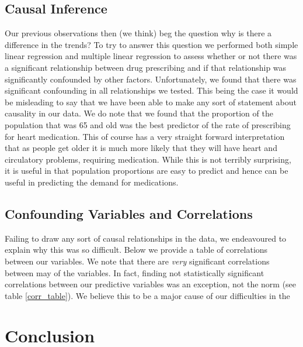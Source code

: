 \documentclass[a4paper]{article}
\begin{document}
	\subsection{Causal Inference}
		Our previous observations then (we think) beg the question why is there a difference in the trends? 
		To try to answer this question we performed both simple linear regression and multiple linear regression 
		to assess whether or not there was a significant relationship between drug prescribing and if 
		that relationship was significantly confounded by other factors. Unfortunately, we found that 
		there was significant confounding in all relationships we tested. This being the case it would
		be misleading to say that we have been able to make any sort of statement about causality 
		in our data. We do note that we found that the proportion of the population that was 65 and
		old was the best predictor of the rate of prescribing for heart medication. This of course has 
		a very straight forward interpretation that as people get older it is much more likely that 
		they will have heart and circulatory problems, requiring medication. While this is not 
		terribly surprising, it is useful in that population proportions are easy to predict and 
		hence can be useful in predicting the demand for medications. 




	\subsection{Confounding Variables and Correlations}
		Failing to draw any sort of causal relationships in the data, we endeavoured to explain 
		why this was so difficult. Below we provide a table of  correlations between our variables. 
		We note that there are \emph{very} significant correlations between may of the variables. 
		In fact, finding not statistically significant correlations between our predictive variables
		was an exception, not the norm (see table \ref{corr_table}). We believe this to be a major cause of our difficulties in the 


\section{Conclusion}
\end{document}
